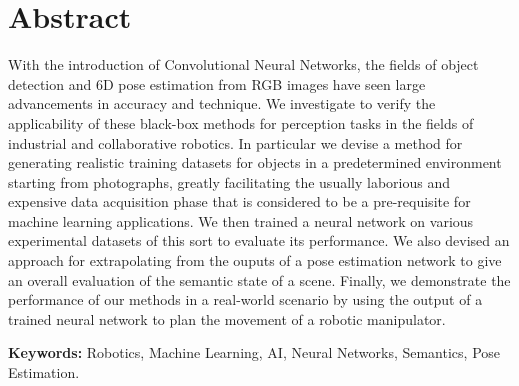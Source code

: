 \chapter*{Abstract} 
With the introduction of Convolutional Neural Networks, the fields of object detection and 6D pose estimation from RGB images have seen large advancements in accuracy and technique. We investigate to verify the applicability of these black-box methods for perception tasks in the fields of industrial and collaborative robotics. In particular we devise a method for generating realistic training datasets for objects in a predetermined environment starting from photographs, greatly facilitating the usually laborious and expensive data acquisition phase that is considered to be a pre-requisite for machine learning applications. We then trained a neural network on various experimental datasets of this sort to evaluate its performance. We also devised an approach for extrapolating from the ouputs of a pose estimation network to give an overall evaluation of the semantic state of a scene. Finally, we demonstrate the performance of our methods in a real-world scenario by using the output of a trained neural network to plan the movement of a robotic manipulator. 

\textbf{Keywords:} Robotics, Machine Learning, AI, Neural Networks, Semantics, Pose Estimation.